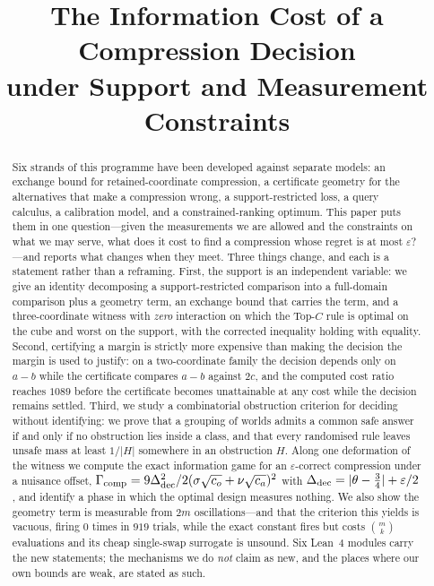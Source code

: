 



\title{The Information Cost of a Compression Decision\\
under Support and Measurement Constraints}

\author{
}

\maketitle

\begin{abstract}
Six strands of this programme have been developed against separate models: an exchange
bound for retained-coordinate compression, a certificate geometry for the alternatives
that make a compression wrong, a support-restricted loss, a query calculus, a calibration
model, and a constrained-ranking optimum. This paper puts them in one question---given the
measurements we are allowed and the constraints on what we may serve, what does it cost to
find a compression whose regret is at most $\varepsilon$?---and reports what changes when
they meet. Three things change, and each is a statement rather than a reframing. First, the
support is an independent variable: we give an identity decomposing a support-restricted
comparison into a full-domain comparison plus a geometry term, an exchange bound that
carries the term, and a three-coordinate witness with \emph{zero} interaction on which the
Top-$C$ rule is optimal on the cube and worst on the support, with the corrected inequality
holding with equality. Second, certifying a margin is strictly more expensive than making
the decision the margin is used to justify: on a two-coordinate family the decision depends
only on $a-b$ while the certificate compares $a-b$ against $2c$, and the computed cost
ratio reaches $1089$ before the certificate becomes unattainable at any cost while the
decision remains settled. Third, we study a combinatorial obstruction criterion for deciding without identifying:
we prove that a grouping of worlds admits a common safe answer if and only if no
obstruction lies inside a class, and that every randomised rule leaves unsafe mass at least
$1/|H|$ somewhere in an obstruction $H$. Along one deformation of the witness we compute
the exact information game for an $\varepsilon$-correct compression under a nuisance
offset, $\Gamma_{\rm comp}=9\Delta_{\rm dec}^{2}/2(\sigma\sqrt{c_{o}}+\nu\sqrt{c_{a}})^{2}$
with $\Delta_{\rm dec}=|\theta-\tfrac34|+\varepsilon/2$, and identify a phase in which the
optimal design measures nothing. We also show the geometry term is measurable from $2m$ oscillations---and that the
criterion this yields is vacuous, firing $0$ times in $919$ trials, while the exact constant
fires but costs $\binom{m}{k}$ evaluations and its cheap single-swap surrogate is unsound.
Six Lean~4 modules carry the new statements; the mechanisms we do \emph{not} claim as new,
and the places where our own bounds are weak, are stated as such.
\end{abstract}

